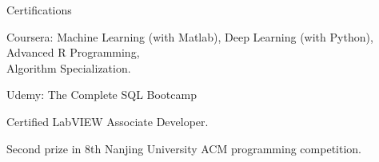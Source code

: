 \documentclass{resume} %
\begin{document}


\vspace{-12pt}
\begin{rSection}{Certifications}\itemsep -3pt
\vspace{-12pt}
\item Coursera: Machine Learning (with Matlab), Deep Learning (with Python), Advanced R Programming,\\ 
\hspace*{4.3em} Algorithm Specialization.
\item Udemy: The Complete SQL Bootcamp
\item Certified LabVIEW Associate Developer.
\item Second prize in 8th Nanjing University ACM programming competition.
\end{rSection}
\end{document}
